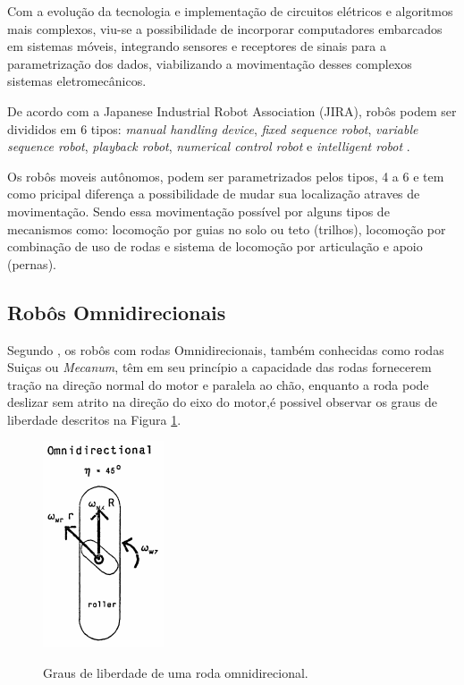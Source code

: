 \documentclass[deposito, acronym, symbols]{fei}
\begin{document}
Com a evolução da tecnologia e implementação de circuitos elétricos e algoritmos mais complexos, viu-se a possibilidade de incorporar computadores embarcados em sistemas móveis, integrando sensores e receptores de sinais para a parametrização dos dados, viabilizando a movimentação desses complexos sistemas eletromecânicos.

De acordo com a Japanese Industrial Robot Association (JIRA), robôs podem ser divididos em 6 tipos: \textit{manual handling device}, \textit{fixed sequence robot}, \textit{variable sequence robot}, \textit{playback robot}, \textit{numerical control robot} e \textit{intelligent robot} \cite{nehmzow2012mobile}.

Os robôs moveis autônomos, podem ser parametrizados pelos tipos, 4 a 6 e tem como pricipal diferença a possibilidade de mudar sua localização atraves de movimentação. Sendo essa movimentação possível por alguns tipos de mecanismos como: locomoção por guias no solo ou teto (trilhos), locomoção por combinação de uso de rodas e sistema de locomoção por articulação e apoio (pernas).

\subsection{Robôs Omnidirecionais}

Segundo \textcite{kinematic}, os robôs com rodas Omnidirecionais, também conhecidas como rodas Suiças ou \textit{Mecanum}, têm em seu princípio a capacidade das rodas fornecerem tração na direção normal do motor e paralela ao chão, enquanto a roda pode deslizar sem atrito na direção do eixo do motor,é possivel observar os graus de liberdade descritos na Figura \ref{fig:grausdeliberdade}. 

\begin{figure}[!htb]
    \centering
    \caption{Graus de liberdade de uma roda omnidirecional.}
    \includegraphics[width=0.3\linewidth]{Graus de liberdade de rodas omnidirecionais.PNG}
    \label{fig:grausdeliberdade}
\end{figure}
\end{document}
